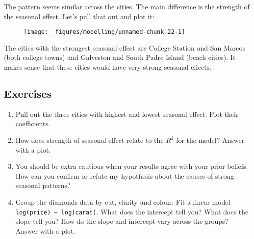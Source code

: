 The pattern seems similar across the cities. The main difference is the
strength of the seasonal effect. Let's pull that out and plot it:

\begin{Shaded}
\end{Shaded}

\begin{figure}[H]
  \centering
  \texttt{[image: \_figures/modelling/unnamed-chunk-22-1]}
\end{figure}

The cities with the strongest seasonal effect are College Station and
San Marcos (both college towns) and Galveston and South Padre Island
(beach cities). It makes sense that these cities would have very strong
seasonal effects.

\hypertarget{exercises-3}{%
\subsection{Exercises}\label{exercises-3}}

\begin{enumerate}
\def\labelenumi{\arabic{enumi}.}
\item
  Pull out the three cities with highest and lowest seasonal effect.
  Plot their coefficients.
\item
  How does strength of seasonal effect relate to the \(R^2\) for the
  model? Answer with a plot.
\item
  You should be extra cautious when your results agree with your prior
  beliefs. How can you confirm or refute my hypothesis about the causes
  of strong seasonal patterns?
\item
  Group the diamonds data by cut, clarity and colour. Fit a linear model
  \texttt{log(price)\ \textasciitilde{}\ log(carat)}. What does the
  intercept tell you? What does the slope tell you? How do the slope and
  intercept vary across the groups? Answer with a plot.
\end{enumerate}


